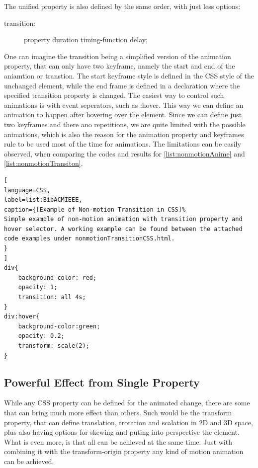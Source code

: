 The unified property is also defined by the same order, with just less options:

\begin{description}
\item [transition:] property duration timing-function delay;
\end{description}

One can imagine the transition being a simplified version of the animation property, that can only have two keyframe, namely the start and end of the aniamtion or transtion. The start keyframe style is defined in the CSS style of the unchanged element, while the end frame is defined in a declaration where the specified transition property is changed. The easiest way to control such animations is with event seperators, such as :hover. This way we can define an animation to happen after hovering over the element. Since we can define just two keyframes and there ano repetitions, we are quite limited with the possible animations, which is also the reason for the animation property and keyframes rule to be used most of the time for animations. The limitations can be easily observed, when comparing the codes and results for \ref{list:nonmotionAnime} and \ref{list:nonmotionTransiton}.

\begin{lstlisting}[
language=CSS,
label=list:BibACMIEEE,
caption={[Example of Non-motion Transition in CSS]%
Simple example of non-motion animation with transition property and hover selector. A working example can be found between the attached code examples under nonmotionTransitionCSS.html.
}
]
div{
	background-color: red;
	opacity: 1;
	transition: all 4s;
}
div:hover{
	background-color:green;
	opacity: 0.2;
	transform: scale(2);
}
\end{lstlisting}
\label{list:nonmotionTransiton}



\subsection{Powerful Effect from Single Property} %
\label{sub:transformCSS}

While any CSS property can be defined for the animated change, there are some that can bring much more effect than others. Such would be the transform property, that can define translation, trotation and scalation in 2D and 3D space, plus also having options for skewing and puting into perspective the element. What is even more, is that all can be achieved at the same time. Just with combining it with the transform-origin property any kind of motion animation can be achieved.

